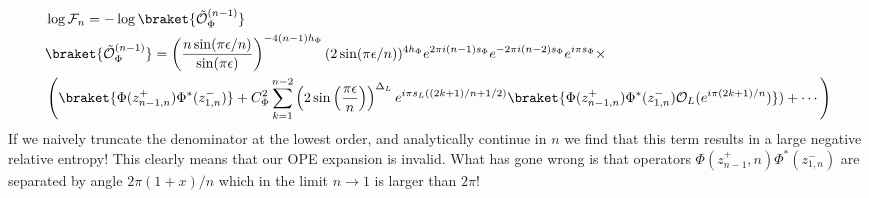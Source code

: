 \documentclass[11pt]{article}
\newcommand{\ep}{\epsilon}
\newcommand{\mO}{\mathcal{O}}
\newcommand{\nn}{\nonumber}
\newcommand{\lb}{\left(}
\newcommand{\rb}{\right)}
\newcommand{\JM}[1]{\textcolor{orange}{#1}}
\begin{document}
\begin{align}
  &\log\mathcal{F}_n=-\log\braket{\tilde{\mO}_{\Phi}^{(n-1)}}\nn \\
&\braket{\tilde{\mO}_{\Phi}^{(n-1)}}=\lb \frac{n \sin(\pi\ep/n)}{\sin(\pi\ep)}\rb^{-4(n-1)h_\Phi}(2\sin(\pi\ep/n))^{4h_\Phi}e^{2\pi i(n-1)s_\Phi  }e^{-2\pi i(n-2) s_\Phi}e^{i\pi s_\Phi}\times \nn\\
&\lb\braket{\Phi(z^+_{n-1,n})\Phi^*(z^-_{1,n})}+C_\Phi^2 \sum_{k=1}^{n-2} \lb 2\sin\lb\frac{\pi\epsilon}{n}\rb\rb^{\Delta_L}e^{i\pi s_L((2k+1)/n + 1/2)}\braket{\Phi(z^+_{n-1,n})\Phi^*(z^-_{1,n}) \mO_L(e^{i\pi (2k+1)/n})})+\cdots\rb
\end{align}
If we naively truncate the denominator at the lowest order, and analytically continue in $n$ we find that this term results in a large negative relative entropy! This clearly means that our OPE expansion is invalid. What has gone wrong is that operators $\Phi(z^+_{n-1},n)\Phi^*(z^-_{1,n})$ are separated by angle $2\pi(1+x)/n$ which in the limit $n\to 1$ is larger than $2\pi$! 
\end{document}
